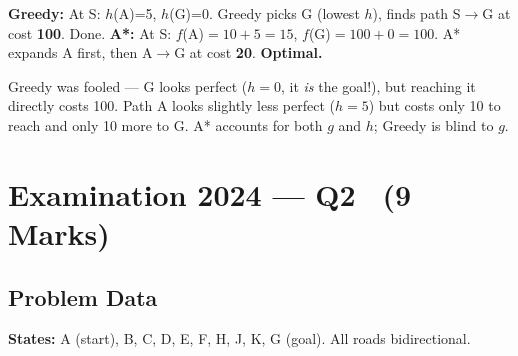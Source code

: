 \documentclass[12pt, a4paper]{article}
\begin{document}
\noindent\textbf{Greedy:} At S: $h$(A)=5, $h$(G)=0. Greedy picks G (lowest $h$), finds path S$\to$G at cost \textbf{100}. Done.
\textbf{A*:} At S: $f$(A)$=10+5=15$, $f$(G)$=100+0=100$. A* expands A first, then A$\to$G at cost \textbf{20}. \textbf{Optimal.}

\noindent Greedy was fooled — G looks perfect ($h{=}0$, it \emph{is} the goal!), but reaching it directly costs 100. Path A looks slightly less perfect ($h{=}5$) but costs only 10 to reach and only 10 more to G. A* accounts for both $g$ and $h$; Greedy is blind to $g$.

\section{Examination 2024 — Q2 \ (9 Marks)}

\subsection{Problem Data}

\noindent\textbf{States:} A (start), B, C, D, E, F, H, J, K, G (goal). All roads bidirectional.
\end{document}

